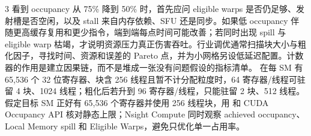 \begin{solutionexercise}{3}
看到 occupancy 从 75\% 降到 50\% 时，首先应问 eligible warps 是否仍足够、发射槽是否空闲，以及 stall 来自内存依赖、SFU 还是同步。如果低 occupancy 伴随更高缓存复用和更少指令，端到端每点时间可能改善；若同时出现 spill 与 eligible warp 枯竭，才说明资源压力真正伤害吞吐。行业调优通常扫描块大小与粗化因子，寻找时间、资源和误差的 Pareto 点，并为小网格另设低延迟配置。计数器的作用是建立因果链，而不是堆成一张没有问题假设的指标清单。
\variantheading 在每 SM 有 65,536 个 32 位寄存器、块含 256 线程且暂不计分配粒度时，64 寄存器/线程可驻留 4 块、1024 线程；粗化后若升到 96 寄存器/线程，只能驻留 2 块、512 线程。
\practiceheading 假定目标 SM 正好有 65,536 个寄存器并使用 256 线程块，用  和 CUDA Occupancy API 核对静态上限；Nsight Compute 同时观察 achieved occupancy、Local Memory spill 和 Eligible Warps，避免只优化单一占用率。
\end{solutionexercise}

